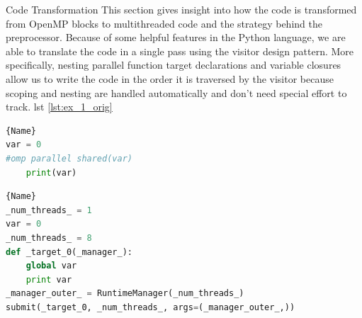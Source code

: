 \documentclass[letterpaper,12pt]{article} %
\makeatletter
\def\section{\@startsection{section}{1}%
  \z@{.7\linespacing\@plus\linespacing}{.5\linespacing}%
  {\normalfont\scshape}}%
\makeatother
\begin{document}
\section{Code Transformation}
This section gives insight into how the code is transformed from OpenMP blocks to multithreaded code and the strategy behind the preprocessor. Because of some helpful features in the Python language, we are able to translate the code in a single pass using the visitor design pattern. More specifically, nesting parallel function target declarations and variable closures allow us to write the code in the order it is traversed by the visitor because scoping and nesting are handled automatically and don't need special effort to track. lst \ref{lst:ex_1_orig}


\begin{lstlisting}[language=Python, caption={Original Code}, label={lst:ex_1_orig}]{Name}
var = 0
#omp parallel shared(var)
    print(var)
\end{lstlisting}


\begin{lstlisting}[language=Python, caption={Transformed Code}, label={lst:ex_1_trans}]{Name}
_num_threads_ = 1
var = 0
_num_threads_ = 8
def _target_0(_manager_):
    global var
    print var
_manager_outer_ = RuntimeManager(_num_threads_)
submit(_target_0, _num_threads_, args=(_manager_outer_,))
\end{lstlisting}
\end{document}
